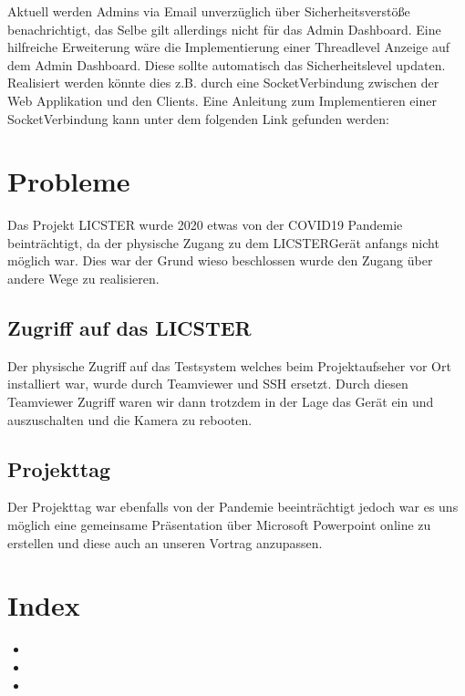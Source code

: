 \documentclass[letterpaper,10pt,ngerman]{sphinxmanual}
\begin{document}
Aktuell werden Admins via Email unverzüglich über Sicherheitsverstöße benachrichtigt, das Selbe gilt allerdings nicht für das Admin Dashboard. Eine hilfreiche Erweiterung wäre die Implementierung einer Threadlevel Anzeige auf dem Admin Dashboard. Diese sollte automatisch das Sicherheitslevel updaten. Realisiert werden könnte dies z.B. durch eine Socket\sphinxhyphen{}Verbindung zwischen der Web Applikation und den Clients. Eine Anleitung zum Implementieren einer Socket\sphinxhyphen{}Verbindung kann unter dem folgenden Link gefunden werden: 


\section{Probleme}
\label{\detokenize{probleme:probleme}}\label{\detokenize{probleme::doc}}
Das Projekt LICSTER wurde 2020 etwas von der COVID\sphinxhyphen{}19 Pandemie beinträchtigt, da der physische Zugang zu dem LICSTER\sphinxhyphen{}Gerät anfangs nicht möglich war. Dies war der Grund wieso beschlossen wurde den Zugang über andere Wege zu realisieren.


\subsection{Zugriff auf das LICSTER}
\label{\detokenize{probleme:zugriff-auf-das-licster}}

Der physische Zugriff auf das Testsystem welches beim Projektaufseher vor Ort installiert war, wurde durch Teamviewer und SSH ersetzt. Durch diesen Teamviewer Zugriff waren wir dann trotzdem in der Lage das Gerät ein\sphinxhyphen{} und auszuschalten und die Kamera zu rebooten.


\subsection{Projekttag}
\label{\detokenize{probleme:projekttag}}
Der Projekttag war ebenfalls von der Pandemie beeinträchtigt jedoch war es uns möglich eine gemeinsame Präsentation über Microsoft Powerpoint online zu erstellen und diese auch an unseren Vortrag anzupassen.


\section{Index}
\label{\detokenize{index:index}}\begin{itemize}
\item {} 

\item {} 

\item {} 

\end{itemize}



\renewcommand{\indexname}{Stichwortverzeichnis}
\printindex
\end{document}

